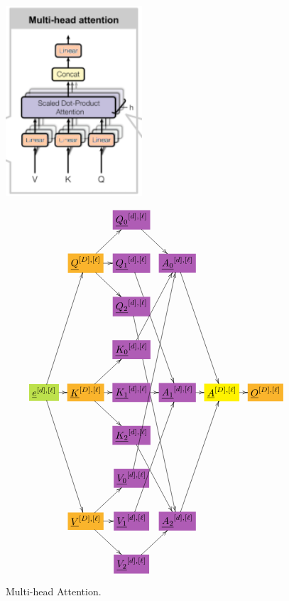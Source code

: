 \documentclass[12pt]{article}
\begin{document}
\begin{figure}[h!]\centering
\begin{minipage}{.3\linewidth}
\includegraphics[width=2in]{multi-head-att.png}
\end{minipage}%
\begin{minipage}{.7\linewidth}
$$\xymatrix@C=0.7pc{
&&*+[F*:Orchid]{\underline{Q_0}^{[d],[\ell]}}\ar[dr]&&&
\\
&*+[F*:Dandelion]{\underline{Q}^{[D], [\ell]}}\ar[ur]\ar[r]\ar[dr]&*+[F*:Orchid]{\underline{Q_1}^{[d],[\ell]}}\ar[dddr]&*+[F*:Orchid]{\underline{A_0}^{[d],[\ell]}}\ar[dddr]&&
\\
&&*+[F*:Orchid]{\underline{Q_2}^{[d],[\ell]}}\ar[dddddr]&&&
\\
&&*+[F*:Orchid]{\underline{K_0}^{[d],[\ell]}}\ar[uur]&&&
\\
*+[F*:SpringGreen]{\underline{e}^{[d], [\ell]}}\ar[r]\ar[uuur]\ar[dddr]&*+[F*:Dandelion]{\underline{K}^{[D], [\ell]}}\ar[ur]\ar[r]\ar[dr]&*+[F*:Orchid]{\underline{K_1}^{[d],[\ell]}}\ar[r]&*+[F*:Orchid]{\underline{A_1}^{[d],[\ell]}}\ar[r]&*+[F*:yellow]{\underline{A}^{[D],[\ell]}}\ar[r]&*+[F*:Dandelion]{\underline{O}^{[D],[\ell]}}
\\
&&*+[F*:Orchid]{\underline{K_2}^{[d],[\ell]}}\ar[ddr]&&&
\\
&&*+[F*:Orchid]{\underline{V_0}^{[d],[\ell]}}\ar[uuuuur]&&&
\\
&*+[F*:Dandelion]{\underline{V}^{[D], [\ell]}}\ar[ur]\ar[r]\ar[dr]&*+[F*:Orchid]{\underline{V_1}^{[d],[\ell]}}\ar[uuur]&*+[F*:Orchid]{\underline{A_2}^{[d],[\ell]}}\ar[uuur]&&
\\
&&*+[F*:Orchid]{\underline{V_2}^{[d],[\ell]}}\ar[ur]&&&
}$$
\end{minipage}
\caption{Multi-head Attention.}
\label{fig-texnn-for-multi-head-att}
\end{figure}
\end{document}
